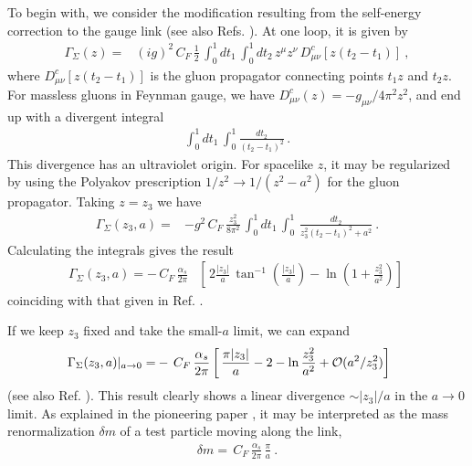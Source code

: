 \documentclass[final,5p,times,twocolumn]{elsarticle}
\begin{document}
To begin with, we consider the modification resulting from the 
self-energy correction  to  the  gauge 
 link    (see also Refs.  \mbox{\cite{Polyakov:1980ca,Chen:2016fxx}).} 
 At one loop, it is   given by
 \begin{align} 
 \Gamma_ \Sigma (z)  = &  ({i} g)^2\,C_F \,\frac12 \,  \int_0^1 dt_1 \,  \int_0^1 dt_2 \, 
  z^\mu z^\nu \,  D_{\mu \nu} ^c [ z (t_2-t_1) ] \  , 
    \label{self}
 \end{align}
 where  $D_{\mu \nu} ^c[z (t_2-t_1)]$ is the gluon propagator connecting points
 $t_1 z$ and $t_2 z$.  For massless gluons  in Feynman gauge, we have 
  $D_{\mu \nu} ^c (z)  =- g_{\mu \nu}  /4\pi^2 z^2$, and end  up with a divergent integral
    \begin{align} 
     \int_0^1 dt_1 \,  \int_0^1 \frac{dt_2}{(t_2-t_1)^2}  \,  .
    \label{t1t2}
 \end{align}
 This divergence has an ultraviolet origin. 
 For spacelike $z$, it may be regularized by  
 using the Polyakov prescription
 \cite{Polyakov:1980ca} \mbox{$1/z^2 \to 1/(z^2-a^2)$}  for the gluon propagator. 
 Taking $z=z_3$  we have
  \begin{align} 
  \Gamma_ \Sigma (z_3,a)  = & - g^2\,C_F \,\frac{z_3^2}{8 \pi^2}
   \,  \int_0^1 dt_1 \,  \int_0^1  \, \frac{dt_2}{ z_3^2 (t_2-t_1)^2 + a^2}  \  . 
    \label{selfa}
 \end{align}
  Calculating the  integrals gives the result 
  \begin{align} 
 \Gamma_  \Sigma (z_3,a)  =   -\,C_F \,\frac{\alpha_s}{2 \pi}
  & 
  \left [ 
   \,
 2  \frac{ |z_3|}{a} \,  \tan
   ^{-1}\left(\frac{|z_3|}{a}\right)   -  \ln 
   \left(1+ \frac{z_3^2}{a^2}\right) \right ] \  
       \label{selfex}
 \end{align}
 coinciding with that given  in Ref. \cite{Chen:2016fxx}. 
 
 
 
 If we keep $z_3$ fixed and take the  small-$a$ limit, we can expand
   \begin{align} 
   \Gamma_\Sigma (z_3,a) |_{a \to 0}  = &  -\,C_F \,\frac{\alpha_s}{2 \pi}
  \left [
   \,
\frac{\pi |z_3|}{a}  - 2 -  \ln \frac{z_3^2}{a^2}  + {\cal O}(a^2/z_3^2) \right ] \   
       \label{selfexexp}
 \end{align}
 (see also Ref. \cite{Ishikawa:2017faj}).  
  This result clearly shows a linear divergence $\sim |z_3|/a$  in the $a \to 0$ limit.
 As explained in the pioneering paper  \cite{Polyakov:1980ca}, it may be interpreted as the mass renormalization
 $\delta m  $ of a test particle moving along the link,
     \begin{align} 
\delta m  =   \, C_F \,\frac{\alpha_s}{2 \pi} \, \frac{\pi}{a} \ . 
       \label{delta_m}
 \end{align}
\end{document}
